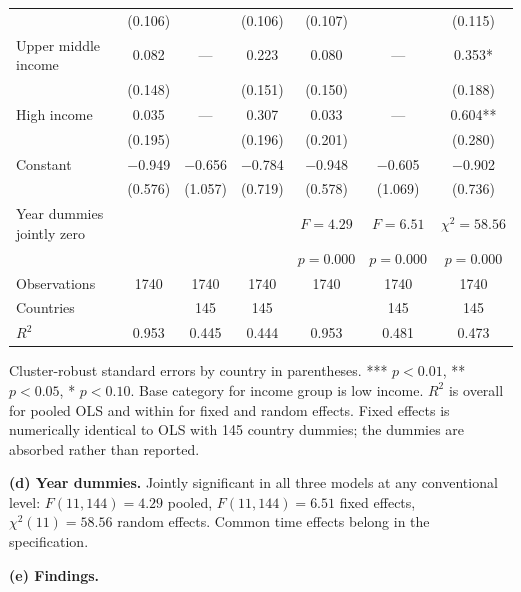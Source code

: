\documentclass[11pt,a4paper]{article}
\begin{document}
\begin{table}[H]
\begin{tabular}{@{}l cccccc@{}}
 & (0.106) &  & (0.106) & (0.107) &  & (0.115) \\
\addlinespace[2pt]
Upper middle income & 0.082 & --- & 0.223 & 0.080 & --- & 0.353* \\
 & (0.148) &  & (0.151) & (0.150) &  & (0.188) \\
\addlinespace[2pt]
High income & 0.035 & --- & 0.307 & 0.033 & --- & 0.604** \\
 & (0.195) &  & (0.196) & (0.201) &  & (0.280) \\
\addlinespace[2pt]
Constant & $-$0.949 & $-$0.656 & $-$0.784 & $-$0.948 & $-$0.605 & $-$0.902 \\
 & (0.576) & (1.057) & (0.719) & (0.578) & (1.069) & (0.736) \\
\midrule
Year dummies jointly zero & & & & $F=4.29$ & $F=6.51$ & $\chi^2=58.56$ \\
& & & & $p=0.000$ & $p=0.000$ & $p=0.000$ \\
\addlinespace[2pt]
Observations & 1740 & 1740 & 1740 & 1740 & 1740 & 1740 \\
Countries & & 145 & 145 & & 145 & 145 \\
$R^2$ & 0.953 & 0.445 & 0.444 & 0.953 & 0.481 & 0.473 \\
\bottomrule
\end{tabular}
\begin{minipage}{\textwidth}\vspace{4pt}\footnotesize
Cluster-robust standard errors by country in parentheses.
*** $p<0.01$, ** $p<0.05$, * $p<0.10$. Base category for income group is low
income. $R^2$ is overall for pooled OLS and within for fixed and random effects.
Fixed effects is numerically identical to OLS with 145 country dummies; the
dummies are absorbed rather than reported.
\end{minipage}
\end{table}

\textbf{(d) Year dummies.} Jointly significant in all three models at any
conventional level: $F(11,144)=4.29$ pooled, $F(11,144)=6.51$ fixed effects,
$\chi^2(11)=58.56$ random effects. Common time effects belong in the
specification.

\textbf{(e) Findings.}
\end{document}
